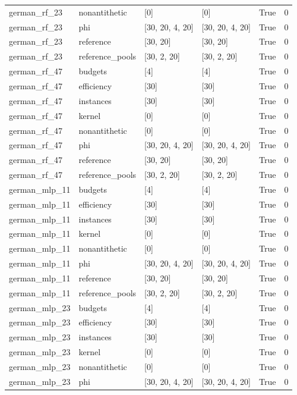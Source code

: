 \begin{tabular}{llllll}
german\_rf\_23 & nonantithetic & [0] & [0] & True & 0 \\
german\_rf\_23 & phi & [30, 20, 4, 20] & [30, 20, 4, 20] & True & 0 \\
german\_rf\_23 & reference & [30, 20] & [30, 20] & True & 0 \\
german\_rf\_23 & reference\_pools & [30, 2, 20] & [30, 2, 20] & True & 0 \\
german\_rf\_47 & budgets & [4] & [4] & True & 0 \\
german\_rf\_47 & efficiency & [30] & [30] & True & 0 \\
german\_rf\_47 & instances & [30] & [30] & True & 0 \\
german\_rf\_47 & kernel & [0] & [0] & True & 0 \\
german\_rf\_47 & nonantithetic & [0] & [0] & True & 0 \\
german\_rf\_47 & phi & [30, 20, 4, 20] & [30, 20, 4, 20] & True & 0 \\
german\_rf\_47 & reference & [30, 20] & [30, 20] & True & 0 \\
german\_rf\_47 & reference\_pools & [30, 2, 20] & [30, 2, 20] & True & 0 \\
german\_mlp\_11 & budgets & [4] & [4] & True & 0 \\
german\_mlp\_11 & efficiency & [30] & [30] & True & 0 \\
german\_mlp\_11 & instances & [30] & [30] & True & 0 \\
german\_mlp\_11 & kernel & [0] & [0] & True & 0 \\
german\_mlp\_11 & nonantithetic & [0] & [0] & True & 0 \\
german\_mlp\_11 & phi & [30, 20, 4, 20] & [30, 20, 4, 20] & True & 0 \\
german\_mlp\_11 & reference & [30, 20] & [30, 20] & True & 0 \\
german\_mlp\_11 & reference\_pools & [30, 2, 20] & [30, 2, 20] & True & 0 \\
german\_mlp\_23 & budgets & [4] & [4] & True & 0 \\
german\_mlp\_23 & efficiency & [30] & [30] & True & 0 \\
german\_mlp\_23 & instances & [30] & [30] & True & 0 \\
german\_mlp\_23 & kernel & [0] & [0] & True & 0 \\
german\_mlp\_23 & nonantithetic & [0] & [0] & True & 0 \\
german\_mlp\_23 & phi & [30, 20, 4, 20] & [30, 20, 4, 20] & True & 0 \\

\end{tabular}
